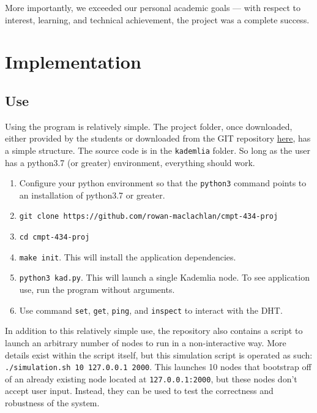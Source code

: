 \documentclass[12pt]{report}
\newcommand{\code}[1]{\colorbox{codegray}{\texttt{#1}}}
\begin{document}
    More importantly, we exceeded our personal academic goals --- with respect
    to interest, learning, and technical achievement, the project was a
    complete success.  
    
    \section{Implementation}
        \subsection{Use\label{use}}
            Using the program is relatively simple.  The project folder, once
            downloaded, either provided by the students or downloaded from the
            GIT repository
            \href{https://github.com/rowan-maclachlan/cmpt-434-proj}{here}, has
            a simple structure.  The source code is in the \code{kademlia}
            folder.  So long as the user has a python3.7 (or greater)
            environment, everything should work.
            \begin{enumerate}
                \item Configure your python environment so that the
                    \code{python3} command points to an installation of
                    python3.7 or greater.
                \item \code{git clone
                    https://github.com/rowan-maclachlan/cmpt-434-proj}
                \item \code{cd cmpt-434-proj}
                \item \code{make init}. This will install the application
                    dependencies.
                \item \code{python3 kad.py}.  This will launch a single
                    Kademlia node.  To see application use, run the program
                    without arguments.
                \item Use command \code{set}, \code{get}, \code{ping}, and
                    \code{inspect} to interact with the DHT.
            \end{enumerate}
            In addition to this relatively simple use, the repository also
            contains a script to launch an arbitrary number of nodes to run in
            a non-interactive way.  More details exist within the script
            itself, but this simulation script is operated as such:
            \code{./simulation.sh 10 127.0.0.1 2000}.  This launches 10 nodes
            that bootstrap off of an already existing node located at
            \code{127.0.0.1:2000}, but these nodes don't accept user input.
            Instead, they can be used to test the correctness and robustness of
            the system.
\end{document}
